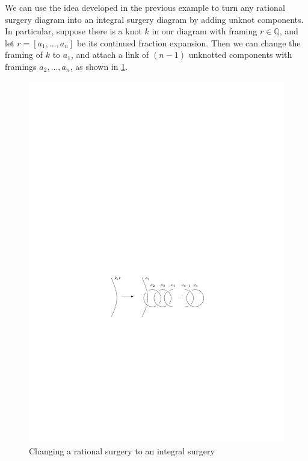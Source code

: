 

\begin{example}
We can use the idea developed in the previous example to turn any rational surgery diagram into an integral surgery diagram by adding unknot components. In particular, suppose there is a knot $k$ in our diagram with framing $r \in \mathbb Q$, and let $r = [a_1,\ldots,a_n]$ be its continued fraction expansion. Then we can change the framing of $k$ to $a_1$, and attach a link of $(n-1)$ unknotted components with framings $a_2,\ldots,a_n$, as shown in \cref{rational-to-integral-surgery}.

\begin{figure}[tb]
\centering
\includegraphics[scale=1]{graphics/rational-to-integral-surgery}
\caption{Changing a rational surgery to an integral surgery}
\label{rational-to-integral-surgery}
\end{figure}
\end{example}



